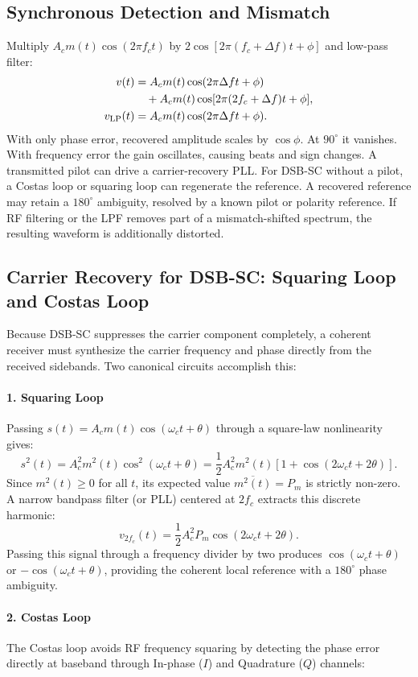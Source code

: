 \documentclass[12pt,a4paper]{article}
\begin{document}
\subsection{Synchronous Detection and Mismatch}
Multiply $A_cm(t)\cos(2\pi f_ct)$ by $2\cos[2\pi(f_c+\Delta f)t+\phi]$ and low-pass filter:
\[
\begin{aligned}
 v(t)&=A_cm(t)\cos(2\pi\Delta ft+\phi)\\
     &\quad+A_cm(t)\cos[2\pi(2f_c+\Delta f)t+\phi],\\
 v_{\rm LP}(t)&=A_cm(t)\cos(2\pi\Delta ft+\phi).
\end{aligned}
\]
With only phase error, recovered amplitude scales by $\cos\phi$. At $90^\circ$ it vanishes. With frequency error the gain oscillates, causing beats and sign changes. A transmitted pilot can drive a carrier-recovery PLL. For DSB-SC without a pilot, a Costas loop or squaring loop can regenerate the reference. A recovered reference may retain a $180^\circ$ ambiguity, resolved by a known pilot or polarity reference. If RF filtering or the LPF removes part of a mismatch-shifted spectrum, the resulting waveform is additionally distorted.

\subsection{Carrier Recovery for DSB-SC: Squaring Loop and Costas Loop}
Because DSB-SC suppresses the carrier component completely, a coherent receiver must synthesize the carrier frequency and phase directly from the received sidebands. Two canonical circuits accomplish this:

\paragraph{1. Squaring Loop}
Passing $s(t)=A_cm(t)\cos(\omega_ct+\theta)$ through a square-law nonlinearity gives:
\[
s^2(t)=A_c^2m^2(t)\cos^2(\omega_ct+\theta)=\frac{1}{2}A_c^2m^2(t)\left[1+\cos(2\omega_ct+2\theta)\right].
\]
Since $m^2(t)\ge 0$ for all $t$, its expected value $\overline{m^2(t)}=P_m$ is strictly non-zero. A narrow bandpass filter (or PLL) centered at $2f_c$ extracts this discrete harmonic:
\[
v_{2f_c}(t)=\frac{1}{2}A_c^2P_m\cos(2\omega_ct+2\theta).
\]
Passing this signal through a frequency divider by two produces $\cos(\omega_ct+\theta)$ or $-\cos(\omega_ct+\theta)$, providing the coherent local reference with a $180^\circ$ phase ambiguity.

\paragraph{2. Costas Loop}
The Costas loop avoids RF frequency squaring by detecting the phase error directly at baseband through In-phase ($I$) and Quadrature ($Q$) channels:
\end{document}
